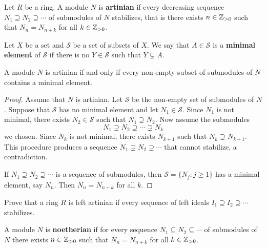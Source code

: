 \chapter{}


\begin{definition}
	Let $R$ be a ring. A module $N$ is \textbf{artinian} if every decreasing sequence 
	$N_1\supseteq N_2\supseteq\cdots$ of submodules of $N$ stabilizes, that is
	there exists $n\in\mathbb{Z}_{>0}$ such that 
	$N_n=N_{n+k}$ for all $k\in\mathbb{Z}_{>0}$.
\end{definition}

Let $X$ be a set and $\mathcal{S}$ be a set of subsets of $X$. 
We say that $A\in\mathcal{S}$ is a \textbf{minimal element} of $\mathcal{S}$
if there is no $Y\in\mathcal{S}$ such that $Y\subsetneq A$. 

\begin{proposition}
\label{pro:artinian_minimal}
	A module $N$ is artinian if and only if every non-empty subset of submodules of $N$ 
	contains a minimal element. 
\end{proposition}

\begin{proof}
	Assume that $N$ is artinian. Let $\mathcal{S}$ be the non-empty set of submodules of $N$. 
	Suppose that $\mathcal{S}$ has no minimal element and let $N_1\in\mathcal{S}$. 
	Since $N_1$ is not minimal, there exists 
	$N_2\in\mathcal{S}$ such that $N_1\supsetneq N_2$. Now assume the 
	submodules 
	\[
	N_1\supsetneq N_2\supseteq\cdots\supsetneq N_k
	\]
	we chosen. 
	Since $N_k$ is not minimal, there exists $N_{k+1}$ such that $N_k\supsetneq N_{k+1}$.
	This procedure produces a sequence $N_1\supsetneq
	N_2\supsetneq\cdots$ that cannot stabilize, a contradiction. 
	
	If $N_1\supseteq N_2\supseteq\cdots$ is a sequence of submodules, then 
	$\mathcal{S}=\{N_j:j\geq1\}$ has a minimal element, say $N_n$. Then
	$N_n=N_{n+k}$ for all $k$. 
\end{proof}

\begin{exercise}
    Prove that a ring $R$ is left artinian if every sequence of 
    left ideals $I_1\supseteq I_2\supseteq\cdots$ stabilizes. 
\end{exercise}

A module $N$ is \textbf{noetherian} if for every sequence 
$N_1\subseteq N_2\subseteq\cdots$ of submodules of $N$ there exists $n\in\mathbb{Z}_{>0}$ such that 
$N_n=N_{n+k}$ for all $k\in\mathbb{Z}_{>0}$. 

